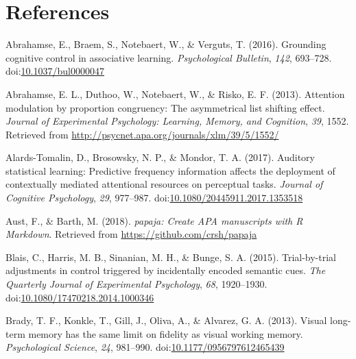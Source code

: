\documentclass[english,,man,floatsintext]{apa6}
\begin{document}
\newpage

\hypertarget{references}{%
\section{References}\label{references}}

\begingroup
\setlength{\parindent}{-0.5in}
\setlength{\leftskip}{0.5in}

\hypertarget{refs}{}
\leavevmode\hypertarget{ref-abrahamse_grounding_2016}{}%
Abrahamse, E., Braem, S., Notebaert, W., \& Verguts, T. (2016). Grounding cognitive control in associative learning. \emph{Psychological Bulletin}, \emph{142}, 693--728. doi:\href{https://doi.org/10.1037/bul0000047}{10.1037/bul0000047}

\leavevmode\hypertarget{ref-abrahamse_attention_2013}{}%
Abrahamse, E. L., Duthoo, W., Notebaert, W., \& Risko, E. F. (2013). Attention modulation by proportion congruency: The asymmetrical list shifting effect. \emph{Journal of Experimental Psychology: Learning, Memory, and Cognition}, \emph{39}, 1552. Retrieved from \url{http://psycnet.apa.org/journals/xlm/39/5/1552/}

\leavevmode\hypertarget{ref-alards-tomalin_auditory_2017}{}%
Alards-Tomalin, D., Brosowsky, N. P., \& Mondor, T. A. (2017). Auditory statistical learning: Predictive frequency information affects the deployment of contextually mediated attentional resources on perceptual tasks. \emph{Journal of Cognitive Psychology}, \emph{29}, 977--987. doi:\href{https://doi.org/10.1080/20445911.2017.1353518}{10.1080/20445911.2017.1353518}

\leavevmode\hypertarget{ref-r_papaja_2018}{}%
Aust, F., \& Barth, M. (2018). \emph{papaja: Create APA manuscripts with R Markdown}. Retrieved from \url{https://github.com/crsh/papaja}

\leavevmode\hypertarget{ref-blais_trial-by-trial_2015}{}%
Blais, C., Harris, M. B., Sinanian, M. H., \& Bunge, S. A. (2015). Trial-by-trial adjustments in control triggered by incidentally encoded semantic cues. \emph{The Quarterly Journal of Experimental Psychology}, \emph{68}, 1920--1930. doi:\href{https://doi.org/10.1080/17470218.2014.1000346}{10.1080/17470218.2014.1000346}

\leavevmode\hypertarget{ref-brady_visual_2013}{}%
Brady, T. F., Konkle, T., Gill, J., Oliva, A., \& Alvarez, G. A. (2013). Visual long-term memory has the same limit on fidelity as visual working memory. \emph{Psychological Science}, \emph{24}, 981--990. doi:\href{https://doi.org/10.1177/0956797612465439}{10.1177/0956797612465439}
\end{document}
